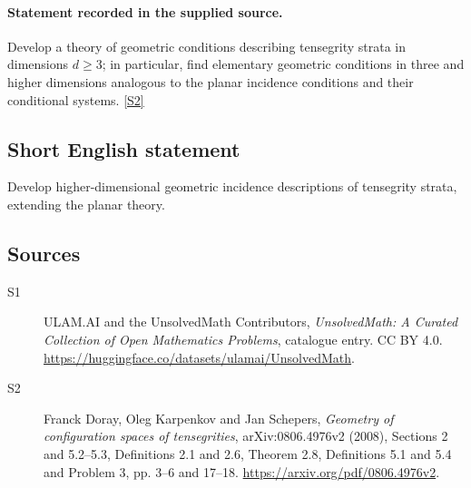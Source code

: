\documentclass[11pt]{article}
\newcommand{\sref}[2]{\hyperlink{source:#1:#2}{[S#2]}}
\begin{document}
\paragraph{Statement recorded in the supplied source.}
Develop a theory of geometric conditions describing tensegrity strata in dimensions $d\geq3$; in particular, find elementary geometric conditions in three and higher dimensions analogous to the planar incidence conditions and their conditional systems. \sref{statement}{2}
\subsection{Short English statement}
Develop higher-dimensional geometric incidence descriptions of tensegrity strata, extending the planar theory.
\subsection{Sources}
\begin{description}
\item[\hypertarget{source:statement:1}{S1}] ULAM.AI and the UnsolvedMath Contributors, \emph{UnsolvedMath: A Curated Collection of Open Mathematics Problems}, catalogue entry. CC BY 4.0. \url{https://huggingface.co/datasets/ulamai/UnsolvedMath}.
\item[\hypertarget{source:statement:2}{S2}] Franck Doray, Oleg Karpenkov and Jan Schepers, \emph{Geometry of configuration spaces of tensegrities}, arXiv:0806.4976v2 (2008), Sections 2 and 5.2--5.3, Definitions 2.1 and 2.6, Theorem 2.8, Definitions 5.1 and 5.4 and Problem 3, pp. 3--6 and 17--18. \url{https://arxiv.org/pdf/0806.4976v2}.
\end{description}
\label{end:statement}
\end{document}
